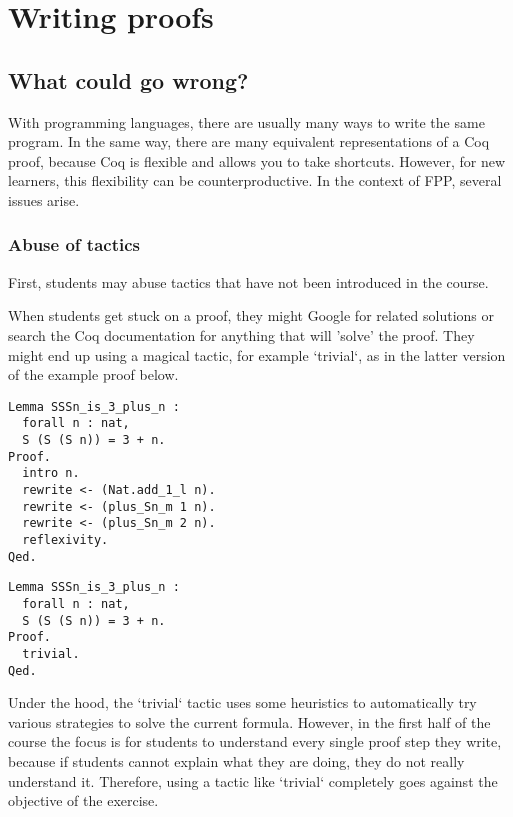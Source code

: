 
\chapter{Writing proofs} %

\label{writing-proofs} %


\section{What could go wrong?}
With programming languages, there are usually many ways to write the same program. In the same way, there are many equivalent representations of a Coq proof, because Coq is flexible and allows you to take shortcuts. However, for new learners, this flexibility can be counterproductive. In the context of FPP, several issues arise. 

\subsection{Abuse of tactics}
First, students may abuse tactics that have not been introduced in the course. 

When students get stuck on a proof, they might Google for related solutions or search the Coq documentation for anything that will 'solve' the proof. They might end up using a magical tactic, for example `trivial`, as in the latter version of the example proof below. 
\begin{verbatim}
Lemma SSSn_is_3_plus_n :
  forall n : nat,
  S (S (S n)) = 3 + n.
Proof.
  intro n.
  rewrite <- (Nat.add_1_l n).
  rewrite <- (plus_Sn_m 1 n).
  rewrite <- (plus_Sn_m 2 n).
  reflexivity.
Qed.
\end{verbatim}

\begin{verbatim}
Lemma SSSn_is_3_plus_n :
  forall n : nat,
  S (S (S n)) = 3 + n.
Proof.
  trivial.
Qed.
\end{verbatim}

Under the hood, the `trivial` tactic uses some heuristics to automatically try various strategies to solve the current formula. However, in the first half of the course the focus is for students to understand every single proof step they write, because if students cannot explain what they are doing, they do not really understand it. Therefore, using a tactic like `trivial` completely goes against the objective of the exercise. 

